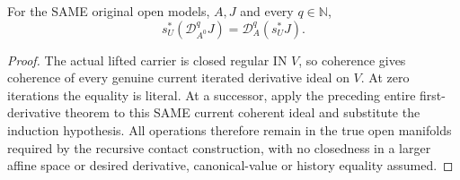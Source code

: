 \begin{theorem}
\label{hir:actual-open-zero-section-whole-iterated-derivative}
\leanok
For the SAME original open models, $A,J$ and every $q\in\mathbb N$,
\[
 s_U^*(\mathcal D_{A^0}^{q}J)=\mathcal D_A^{q}(s_U^*J).
\]
\end{theorem}
\begin{proof}
The actual lifted carrier is closed regular IN $V$, so coherence gives coherence of every genuine current iterated derivative ideal on $V$. At zero iterations the equality is literal. At a successor, apply the preceding entire first-derivative theorem to this SAME current coherent ideal and substitute the induction hypothesis. All operations therefore remain in the true open manifolds required by the recursive contact construction, with no closedness in a larger affine space or desired derivative, canonical-value or history equality assumed.
\end{proof}
